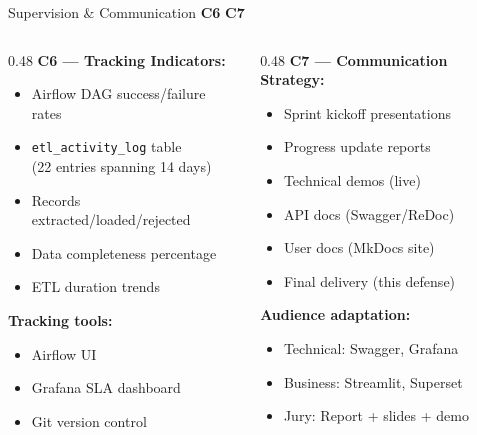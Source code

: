 \documentclass[aspectratio=169, 10pt]{beamer}
\newcommand{\competency}[1]{\textbf{\color{ntblue}#1}}
\begin{document}
\begin{frame}{Supervision \& Communication \competency{C6} \competency{C7}}
\begin{columns}[T]
\begin{column}{0.48\textwidth}
  \textbf{C6 --- Tracking Indicators:}
  \begin{itemize}\small
    \item Airflow DAG success/failure rates
    \item \texttt{etl\_activity\_log} table\\(22 entries spanning 14 days)
    \item Records extracted/loaded/rejected
    \item Data completeness percentage
    \item ETL duration trends
  \end{itemize}
  \vspace{0.3cm}
  \textbf{Tracking tools:}
  \begin{itemize}\small
    \item Airflow UI
    \item Grafana SLA dashboard
    \item Git version control
  \end{itemize}
\end{column}
\begin{column}{0.48\textwidth}
  \textbf{C7 --- Communication Strategy:}
  \begin{itemize}\small
    \item Sprint kickoff presentations
    \item Progress update reports
    \item Technical demos (live)
    \item API docs (Swagger/ReDoc)
    \item User docs (MkDocs site)
    \item Final delivery (this defense)
  \end{itemize}
  \vspace{0.3cm}
  \textbf{Audience adaptation:}
  \begin{itemize}\small
    \item Technical: Swagger, Grafana
    \item Business: Streamlit, Superset
    \item Jury: Report + slides + demo
  \end{itemize}
\end{column}
\end{columns}

\end{frame}
\end{document}
